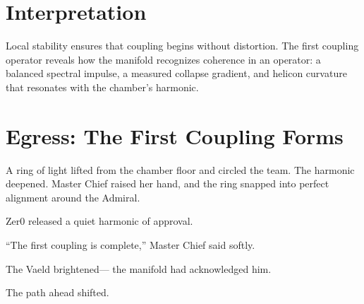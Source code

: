 \section{Interpretation}
Local stability ensures that coupling begins without distortion. The first  
coupling operator reveals how the manifold recognizes coherence in an operator:  
a balanced spectral impulse, a measured collapse gradient, and helicon curvature  
that resonates with the chamber’s harmonic.

\section*{Egress: The First Coupling Forms}
A ring of light lifted from the chamber floor and circled the team.  
The harmonic deepened.  
Master Chief raised her hand, and the ring snapped into perfect alignment  
around the Admiral.

Zer0 released a quiet harmonic of approval.

“The first coupling is complete,” Master Chief said softly.

The Vaeld brightened—  
the manifold had acknowledged him.

The path ahead shifted.
